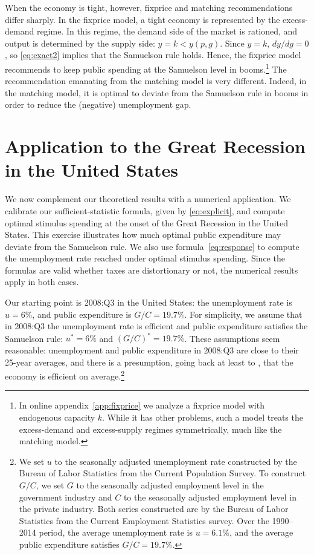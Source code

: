 \documentclass[letterpaper,12pt,leqno]{article}
\begin{document}
\begin{bibunit}
When the economy is tight, however, fixprice and matching recommendations differ sharply. In the fixprice model, a tight economy is represented by the excess-demand regime. In this regime, the demand side of the market is rationed, and output is determined by the supply side: $y=k<y(p,g)$. Since $y=k$, $dy/dg=0$, so \eqref{eq:exact2} implies that the Samuelson rule holds. Hence, the fixprice model recommends to keep public spending at the Samuelson level in booms.\footnote{In online appendix~\ref{app:fixprice} we analyze a fixprice model with endogenous capacity $k$. While it has other problems, such a model treats the excess-demand and excess-supply regimes symmetrically, much like the matching model.} The recommendation emanating from the matching model is very different. Indeed, in the matching model, it is optimal to deviate from the Samuelson rule in booms in order to reduce the (negative) unemployment gap.

\section{Application to the Great Recession in the United States}\label{sec:application}

We now complement our theoretical results with a numerical application. We calibrate our sufficient-statistic formula, given by \eqref{eq:explicit}, and compute optimal stimulus spending at the onset of the Great Recession in the United States. This exercise illustrates how much optimal public expenditure may deviate from the Samuelson rule. We also use formula~\eqref{eq:response} to compute the unemployment rate reached under optimal stimulus spending. Since the formulas are valid whether taxes are distortionary or not, the numerical results apply in both cases.

Our starting point is 2008:Q3 in the United States: the unemployment rate is $u=6\%$, and public expenditure is $G/C=19.7\%$. For simplicity, we assume that in 2008:Q3 the unemployment rate is efficient and public expenditure satisfies the Samuelson rule: $u^{*}=6\%$ and $(G/C)^{*}=19.7\%$. These assumptions seem reasonable: unemployment and public expenditure in 2008:Q3 are close to their 25-year averages, and there is a presumption, going back at least to , that the economy is efficient on average.\footnote{We set $u$ to the seasonally adjusted unemployment rate constructed by the Bureau of Labor Statistics from the Current Population Survey. To construct $G/C$, we set $G$ to the seasonally adjusted employment level in the government industry and $C$ to the seasonally adjusted employment level in the private industry. Both series constructed are by the Bureau of Labor Statistics from the Current Employment Statistics survey. Over the 1990--2014 period, the average unemployment rate is $u=6.1\%$, and the average public expenditure satisfies $G/C=19.7\%$.} 


\end{bibunit}
\end{document}

